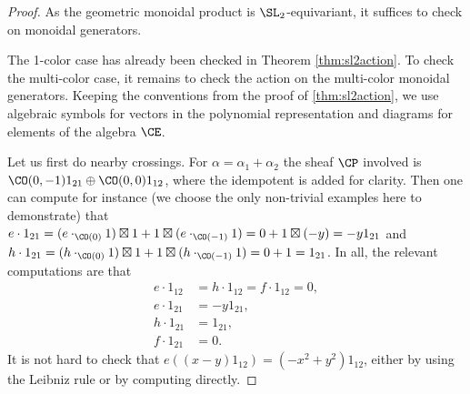 \documentclass[11pt,reqno]{amsart}
\begin{document}
\begin{proof}
    As the geometric monoidal product is $\SL_2$-equivariant, it suffices to check on monoidal generators. 

    The 1-color case has already been checked in Theorem \ref{thm:sl2action}. To check the multi-color case, it remains to check the action on the multi-color monoidal generators. Keeping the conventions from the proof of \ref{thm:sl2action}, we use algebraic symbols for vectors in the polynomial representation and diagrams for elements of the algebra $\CE$. 

    Let us first do nearby crossings. For $\alpha=\alpha_1+\alpha_2$ the sheaf $\CP$ involved is $\CO(0,-1)1_{21}\oplus\CO(0,0)1_{12}$, where the idempotent is added for clarity. Then one can compute for instance (we choose the only non-trivial examples here to demonstrate) that $e\cdot 1_{21}=(e\cdot_{\CO(0)} 1)\boxtimes 1+1\boxtimes (e\cdot_{\CO(-1)} 1)=0+1\boxtimes (-y)=-y 1_{21}$ and $h\cdot 1_{21}=(h\cdot_{\CO(0)} 1)\boxtimes 1+1\boxtimes (h\cdot_{\CO(-1)} 1)=0+1=1_{21}$. In all, the relevant computations are that
    \begin{align*}
        e\cdot 1_{12}&=h\cdot 1_{12}=f\cdot 1_{12}=0,\\
        e\cdot 1_{21}&=-y1_{21},\\
        h\cdot 1_{21}&=1_{21},\\
        f\cdot 1_{21}&=0.
    \end{align*}
    It is not hard to check that $e((x-y)1_{12})=(-x^2+y^2)1_{12}$, either by using the Leibniz rule or by computing directly. 


\end{proof}
\end{document}
